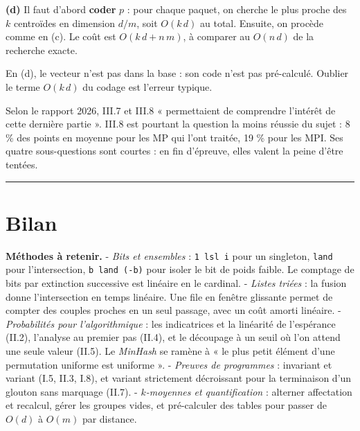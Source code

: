 \documentclass[11pt,a4paper]{article}
\begin{document}
\textbf{(d)} Il faut d'abord \textbf{coder} \(p\) : pour chaque paquet, on cherche le plus proche des \(k\) centroïdes en dimension \(d/m\), soit \(O(k\,d)\) au total. Ensuite, on procède comme en (c). Le coût est \(\boxed{O(k\,d+n\,m)}\), à comparer au \(O(n\,d)\) de la recherche exacte.

\begin{piege}

En (d), le vecteur n'est pas dans la base : son code n'est pas pré-calculé. Oublier le terme \(O(k\,d)\) du codage est l'erreur typique.

\end{piege}

\begin{jury}

Selon le rapport 2026, III.7 et III.8 « permettaient de comprendre l'intérêt de cette dernière partie ». III.8 est pourtant la question la moins réussie du sujet : 8 \% des points en moyenne pour les MP qui l'ont traitée, 19 \% pour les MPI. Ses quatre sous-questions sont courtes : en fin d'épreuve, elles valent la peine d'être tentées.

\end{jury}

\begin{center}\rule{0.5\linewidth}{0.5pt}\end{center}

\hypertarget{bilan}{%
\section{Bilan}\label{bilan}}

\textbf{Méthodes à retenir.}
- \emph{Bits et ensembles} : \texttt{1\ lsl\ i} pour un singleton, \texttt{land} pour l'intersection, \texttt{b\ land\ (-b)} pour isoler le bit de poids faible. Le comptage de bits par extinction successive est linéaire en le cardinal.
- \emph{Listes triées} : la fusion donne l'intersection en temps linéaire. Une file en fenêtre glissante permet de compter des couples proches en un seul passage, avec un coût amorti linéaire.
- \emph{Probabilités pour l'algorithmique} : les indicatrices et la linéarité de l'espérance (II.2), l'analyse au premier pas (II.4), et le découpage à un seuil où l'on attend une seule valeur (II.5). Le \emph{MinHash} se ramène à « le plus petit élément d'une permutation uniforme est uniforme ».
- \emph{Preuves de programmes} : invariant et variant (I.5, II.3, I.8), et variant strictement décroissant pour la terminaison d'un glouton sans marquage (II.7).
- \emph{\(k\)-moyennes et quantification} : alterner affectation et recalcul, gérer les groupes vides, et pré-calculer des tables pour passer de \(O(d)\) à \(O(m)\) par distance.
\end{document}
